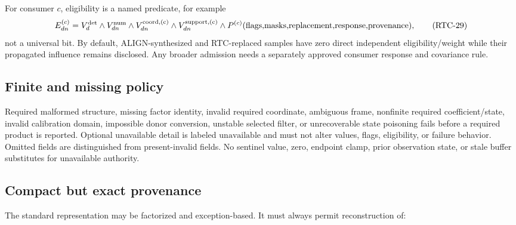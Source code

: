 \documentclass[11pt]{article}
\newcommand{\unavail}{\ensuremath{\mathrm{unavailable}}}
\begin{document}
For consumer $c$, eligibility is a named predicate, for example
\begin{equation}
 E^{(c)}_{dn}=
 V^{\rm det}_d\land V^{\rm num}_{dn}\land V^{\rm coord,(c)}_{dn}
 \land V^{\rm support,(c)}_{dn}\land
 P^{(c)}(\hbox{flags,masks,replacement,response,provenance}),
 \tag{RTC-29}\label{eq:eligibility}
\end{equation}
not a universal bit.  By default, ALIGN-synthesized and RTC-replaced samples
have zero direct independent eligibility/weight while their propagated
influence remains disclosed.  Any broader admission needs a separately
approved consumer response and covariance rule.

\subsection{Finite and missing policy}

Required malformed structure, missing factor identity, invalid required
coordinate, ambiguous frame, nonfinite required coefficient/state, invalid
calibration domain, impossible donor conversion, unstable selected filter, or
unrecoverable state poisoning fails before a required product is reported.
Optional unavailable detail is labeled \unavail{} and must not alter values,
flags, eligibility, or failure behavior.  Omitted fields are distinguished
from present-invalid fields.  No sentinel value, zero, endpoint clamp, prior
observation state, or stale buffer substitutes for unavailable authority.

\subsection{Compact but exact provenance}

The standard representation may be factorized and exception-based.  It must
always permit reconstruction of:
\end{document}

